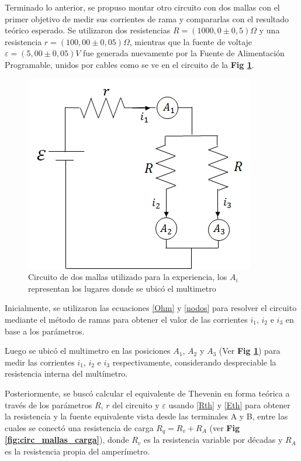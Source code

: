 \documentclass[11pt,a4paper]{article}
\begin{document}
Terminado lo anterior, se propuso montar otro circuito con dos mallas con el primer objetivo de medir sus corrientes de rama y compararlas con el resultado teórico esperado. Se utilizaron dos resistencias $R = (1000,0\pm0,5)\Omega$ y una resistencia $r = (100,00\pm0,05)\Omega$, mientras que la fuente de voltaje $\varepsilon = (5,00\pm0,05)V$ fue generada nuevamente por la Fuente de Alimentación Programable, unidos por cables como se ve en el circuito de la \textbf{Fig \ref{fig:circ_mallas}}.

\begin{figure}[h]
  \centering
  \includegraphics[scale=0.55]{Mallas_sin_carga}
  \caption{Circuito de dos mallas utilizado para la experiencia, los $A_i$ representan los lugares donde se ubicó el multimetro}
  \label{fig:circ_mallas}
\end{figure}

Inicialmente, se utilizaron las ecuaciones \eqref{Ohm} y \eqref{nodos} para resolver el circuito mediante el método de ramas para obtener el valor de las corrientes $i_1$, $i_2$ e $i_3$ en base a los parámetros. 
 
Luego se ubicó el multimetro en las posiciones $A_1$, $A_2$ y $A_3$ (Ver \textbf{Fig \ref{fig:circ_mallas}}) para medir las corrientes $i_1$, $i_2$ e $i_3$ respectivamente, considerando despreciable la resistencia interna del multímetro.
 
Posteriormente, se buscó calcular el equivalente de Thevenin en forma teórica a través de los parámetros $R$, $r$ del circuito y $\varepsilon$ usando \eqref{Rth} y \eqref{Eth} para obtener la resistencia y la fuente equivalente vista desde las terminales A y B, entre las cuales se conectó una resistencia de carga $R_q = R_v + R_A$ (ver \textbf{Fig \ref{fig:circ_mallas_carga}}), donde $R_v$ es la resistencia variable por décadas y $R_A$ es la resistencia propia del amperímetro. 
\end{document}
